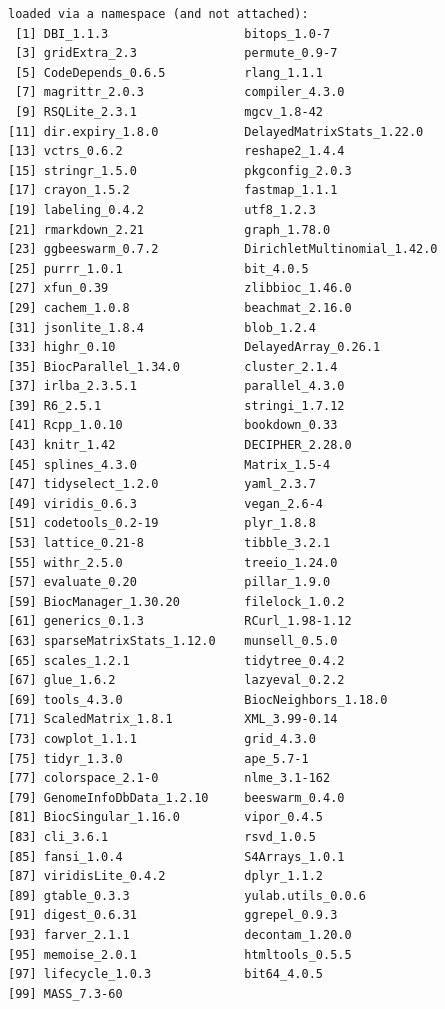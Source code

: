 \documentclass[
]{book}
\begin{document}
\begin{verbatim}
loaded via a namespace (and not attached):
 [1] DBI_1.1.3                   bitops_1.0-7               
 [3] gridExtra_2.3               permute_0.9-7              
 [5] CodeDepends_0.6.5           rlang_1.1.1                
 [7] magrittr_2.0.3              compiler_4.3.0             
 [9] RSQLite_2.3.1               mgcv_1.8-42                
[11] dir.expiry_1.8.0            DelayedMatrixStats_1.22.0  
[13] vctrs_0.6.2                 reshape2_1.4.4             
[15] stringr_1.5.0               pkgconfig_2.0.3            
[17] crayon_1.5.2                fastmap_1.1.1              
[19] labeling_0.4.2              utf8_1.2.3                 
[21] rmarkdown_2.21              graph_1.78.0               
[23] ggbeeswarm_0.7.2            DirichletMultinomial_1.42.0
[25] purrr_1.0.1                 bit_4.0.5                  
[27] xfun_0.39                   zlibbioc_1.46.0            
[29] cachem_1.0.8                beachmat_2.16.0            
[31] jsonlite_1.8.4              blob_1.2.4                 
[33] highr_0.10                  DelayedArray_0.26.1        
[35] BiocParallel_1.34.0         cluster_2.1.4              
[37] irlba_2.3.5.1               parallel_4.3.0             
[39] R6_2.5.1                    stringi_1.7.12             
[41] Rcpp_1.0.10                 bookdown_0.33              
[43] knitr_1.42                  DECIPHER_2.28.0            
[45] splines_4.3.0               Matrix_1.5-4               
[47] tidyselect_1.2.0            yaml_2.3.7                 
[49] viridis_0.6.3               vegan_2.6-4                
[51] codetools_0.2-19            plyr_1.8.8                 
[53] lattice_0.21-8              tibble_3.2.1               
[55] withr_2.5.0                 treeio_1.24.0              
[57] evaluate_0.20               pillar_1.9.0               
[59] BiocManager_1.30.20         filelock_1.0.2             
[61] generics_0.1.3              RCurl_1.98-1.12            
[63] sparseMatrixStats_1.12.0    munsell_0.5.0              
[65] scales_1.2.1                tidytree_0.4.2             
[67] glue_1.6.2                  lazyeval_0.2.2             
[69] tools_4.3.0                 BiocNeighbors_1.18.0       
[71] ScaledMatrix_1.8.1          XML_3.99-0.14              
[73] cowplot_1.1.1               grid_4.3.0                 
[75] tidyr_1.3.0                 ape_5.7-1                  
[77] colorspace_2.1-0            nlme_3.1-162               
[79] GenomeInfoDbData_1.2.10     beeswarm_0.4.0             
[81] BiocSingular_1.16.0         vipor_0.4.5                
[83] cli_3.6.1                   rsvd_1.0.5                 
[85] fansi_1.0.4                 S4Arrays_1.0.1             
[87] viridisLite_0.4.2           dplyr_1.1.2                
[89] gtable_0.3.3                yulab.utils_0.0.6          
[91] digest_0.6.31               ggrepel_0.9.3              
[93] farver_2.1.1                decontam_1.20.0            
[95] memoise_2.0.1               htmltools_0.5.5            
[97] lifecycle_1.0.3             bit64_4.0.5                
[99] MASS_7.3-60                
\end{verbatim}
\end{document}
